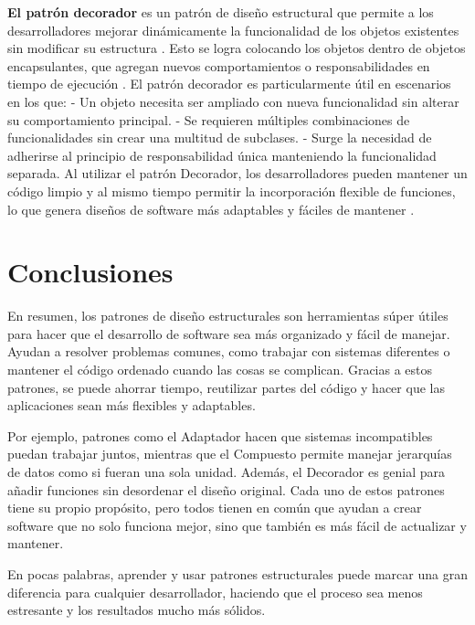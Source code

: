 \documentclass[12pt]{article}
\begin{document}
\textbf{El patrón decorador} es un patrón de diseño estructural que permite a los desarrolladores mejorar dinámicamente la funcionalidad de los objetos existentes sin modificar su estructura \cite{ref9}. Esto se logra colocando los objetos dentro de objetos encapsulantes, que agregan nuevos comportamientos o responsabilidades en tiempo de ejecución \cite{ref10}. El patrón decorador es particularmente útil en escenarios en los que:\newline
- Un objeto necesita ser ampliado con nueva funcionalidad sin alterar su comportamiento principal.\newline
- Se requieren múltiples combinaciones de funcionalidades sin crear una multitud de subclases.\newline
- Surge la necesidad de adherirse al principio de responsabilidad única manteniendo la funcionalidad separada.\newline
Al utilizar el patrón Decorador, los desarrolladores pueden mantener un código limpio y al mismo tiempo permitir la incorporación flexible de funciones, lo que genera diseños de software más adaptables y fáciles de mantener \cite{ref11}.

\section*{Conclusiones}
En resumen, los patrones de diseño estructurales son herramientas súper útiles para hacer que el desarrollo de software sea más organizado y fácil de manejar. Ayudan a resolver problemas comunes, como trabajar con sistemas diferentes o mantener el código ordenado cuando las cosas se complican. Gracias a estos patrones, se puede ahorrar tiempo, reutilizar partes del código y hacer que las aplicaciones sean más flexibles y adaptables.

Por ejemplo, patrones como el Adaptador hacen que sistemas incompatibles puedan trabajar juntos, mientras que el Compuesto permite manejar jerarquías de datos como si fueran una sola unidad. Además, el Decorador es genial para añadir funciones sin desordenar el diseño original. Cada uno de estos patrones tiene su propio propósito, pero todos tienen en común que ayudan a crear software que no solo funciona mejor, sino que también es más fácil de actualizar y mantener.

En pocas palabras, aprender y usar patrones estructurales puede marcar una gran diferencia para cualquier desarrollador, haciendo que el proceso sea menos estresante y los resultados mucho más sólidos.
\end{document}
